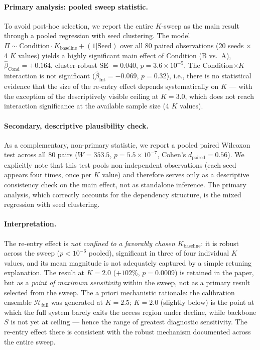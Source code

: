 ﻿\documentclass[11pt,a4paper]{article}
\theoremstyle{plain}
\theoremstyle{definition}
\theoremstyle{remark}
\begin{document}
\paragraph{Primary analysis: pooled sweep statistic.} To avoid post-hoc selection, we report the entire $K$-sweep as the main result through a pooled regression with seed clustering. The model $\Pi \sim \mathrm{Condition} \cdot K_{\mathrm{baseline}} + (1|\mathrm{Seed})$ over all 80 paired observations (20 seeds $\times$ 4 $K$ values) yields a highly significant main effect of Condition (B vs.\ A), $\hat{\beta}_{\mathrm{Cond}} = +0.164$, cluster-robust SE $= 0.040$, $p = 3.6 \times 10^{-5}$. The Condition$\times$$K$ interaction is not significant ($\hat{\beta}_{\mathrm{Int}} = -0.069$, $p = 0.32$), i.e., there is no statistical evidence that the size of the re-entry effect depends systematically on $K$ --- with the exception of the descriptively visible ceiling at $K = 3.0$, which does not reach interaction significance at the available sample size (4 $K$ values).

\paragraph{Secondary, descriptive plausibility check.} As a complementary, non-primary statistic, we report a pooled paired Wilcoxon test across all 80 pairs ($W = 353.5$, $p = 5.5 \times 10^{-7}$, Cohen's $d_\mathrm{paired} = 0.56$). We explicitly note that this test pools non-independent observations (each seed appears four times, once per $K$ value) and therefore serves only as a descriptive consistency check on the main effect, not as standalone inference. The primary analysis, which correctly accounts for the dependency structure, is the mixed regression with seed clustering.

\paragraph{Interpretation.} The re-entry effect is \emph{not confined to a favorably chosen $K_{\mathrm{baseline}}$}: it is robust across the sweep ($p < 10^{-6}$ pooled), significant in three of four individual $K$ values, and its mean magnitude is not adequately captured by a simple retuning explanation. The result at $K = 2.0$ ($+102\%$, $p = 0.0009$) is retained in the paper, but as a \emph{point of maximum sensitivity} within the sweep, not as a primary result selected from the sweep. The a priori mechanistic rationale: the calibration ensemble $\mathcal{H}_{\mathrm{full}}$ was generated at $K = 2.5$; $K = 2.0$ (slightly below) is the point at which the full system barely exits the access region under decline, while backbone $S$ is not yet at ceiling --- hence the range of greatest diagnostic sensitivity. The re-entry effect there is consistent with the robust mechanism documented across the entire sweep.
\end{document}
